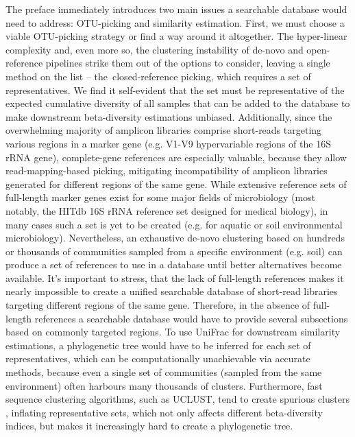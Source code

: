 \documentclass[10pt,letterpaper]{article}
\begin{document}
The preface immediately introduces two main issues a searchable database would need to address: OTU-picking and similarity estimation. 
First, we must choose a viable OTU-picking strategy or find a way around it altogether. The hyper-linear complexity and, even more so, the clustering instability of de-novo and open-reference pipelines \cite{He2015} strike them out of the options to consider, leaving a single method on the list – the closed-reference picking, which requires a set of representatives. 
We find it self-evident that the set must be representative of the expected cumulative diversity of all samples that can be added to the database to make downstream beta-diversity estimations unbiased.
Additionally, since the overwhelming majority of amplicon libraries comprise short-reads targeting various regions in a marker gene (e.g. V1-V9 hypervariable regions of the 16S rRNA gene), complete-gene references are especially valuable, because they allow read-mapping-based picking, mitigating incompatibility of amplicon libraries generated for different regions of the same gene. 
While extensive reference sets of full-length marker genes exist for some major fields of microbiology (most notably, the HITdb \cite{Ritari2015} 16S rRNA reference set designed for medical biology), in many cases such a set is yet to be created (e.g. for aquatic or soil environmental microbiology). 
Nevertheless, an exhaustive de-novo clustering based on hundreds or thousands of communities sampled from a specific environment (e.g. soil) can produce a set of references to use in a database until better alternatives become available.
It’s important to stress, that the lack of full-length references makes it nearly impossible to create a unified searchable database of short-read libraries targeting different regions of the same gene. 
Therefore, in the absence of full-length references a searchable database would have to provide several subsections based on commonly targeted regions. 
To use UniFrac for downstream similarity estimations, a phylogenetic tree would have to be inferred for each set of representatives, which can be computationally unachievable via accurate methods, because even a single set of communities (sampled from the same environment) often harbours many thousands of clusters. 
Furthermore, fast sequence clustering algorithms, such as UCLUST, tend to create spurious clusters \cite{Huse2010}, inflating representative sets, which not only affects different beta-diversity indices, but makes it increasingly hard to create a phylogenetic tree.
\end{document}
